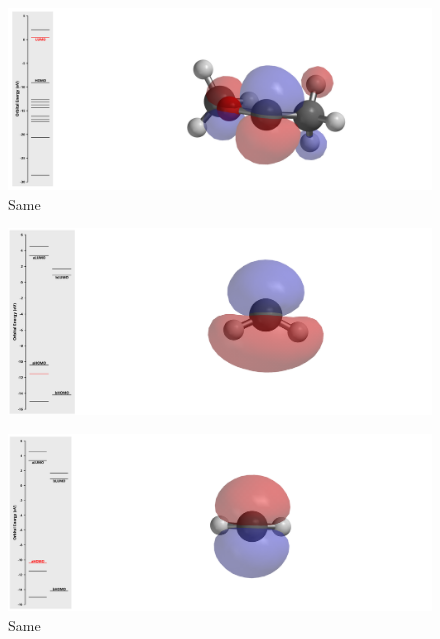\documentclass[twocolumn]{article} %
\begin{document}
\begin{figure}[h!]
      \centering
      \includegraphics[width=0.95\columnwidth]{C(OMe)Me LUMO white.png} %
      \vspace{2mm} %
      \caption{Same}
\end{figure}

\begin{figure}[h!]
      \centering
      \includegraphics[width=0.95\columnwidth]{CH2 HOMO-1.png} %
      \vspace{2mm} %
\end{figure}

\begin{figure}[h!]
      \centering
      \includegraphics[width=0.95\columnwidth]{CH2 HOMO.png} %
      \vspace{2mm} %
      \caption{Same}
\end{figure}
\end{document}

